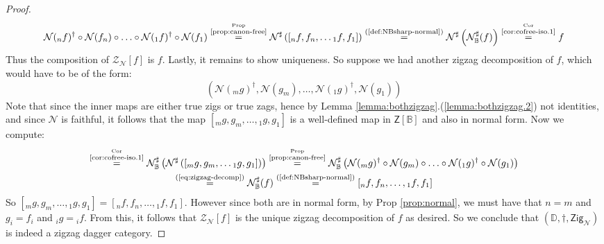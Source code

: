 \documentclass[10pt]{article}
\begin{document}
\begin{proof}
\begin{gather*}
\mathcal{N}({}_nf)^\dagger \circ \mathcal{N}(f_n) \circ \hdots \circ \mathcal{N}({}_1f)^\dagger \circ \mathcal{N}(f_1) \overset{\overset{\text{Prop}}{\text{\ref{prop:canon-free}}}}{=} \mathcal{N}^\sharp\left(\left[ {}_nf, f_n, \hdots {}_1f, f_1 \right]  \right) \overset{\text{(\ref{def:NBsharp-normal})}}{=} \mathcal{N}^\sharp\left(\mathcal{N}_\mathbb{B}^\sharp(f) \right) \overset{\overset{\text{Cor}}{\text{\ref{cor:cofree-iso.1}}}}{=} f
\end{gather*}
Thus the composition of $\mathcal{Z}_{\mathcal{N}}[f]$ is $f$. Lastly, it remains to show uniqueness. So suppose we had another zigzag decomposition of $f$, which would have to be of the form:
\[ \left( \mathcal{N}({}_mg)^\dagger, \mathcal{N}(g_m), \hdots, \mathcal{N}({}_1g)^\dagger, \mathcal{N}(g_1) \right) \]
Note that since the inner maps are either true zigs or true zags, hence by Lemma \ref{lemma:bothzigzag}.(\ref{lemma:bothzigzag.2}) not identities, and since $\mathcal{N}$ is faithful, it follows that the map $[{}_mg, g_m, \hdots, {}_1g, g_1]$ is a well-defined map in $\mathsf{Z}[\mathbb{B}]$ and also in normal form. Now we compute: 
\begin{gather*}
[{}_mg, g_m, \hdots, {}_1g, g_1] \overset{\overset{\text{Cor}}{\text{\ref{cor:cofree-iso.1}}}}{=} \mathcal{N}_\mathbb{B}^\sharp \left( \mathcal{N}^\sharp\left(\left[ {}_mg, g_m, \hdots {}_1g, g_1 \right]  \right) \right) \overset{\overset{\text{Prop}}{\text{\ref{prop:canon-free}}}}{=} \mathcal{N}_\mathbb{B}^\sharp \left( \mathcal{N}({}_mg)^\dagger \circ \mathcal{N}(g_m) \circ \hdots \circ \mathcal{N}({}_1g)^\dagger \circ \mathcal{N}(g_1) \right) \\\overset{\text{(\ref{eq:zigzag-decomp})}}{=} \mathcal{N}_\mathbb{B}^\sharp(f) \overset{\text{(\ref{def:NBsharp-normal})}}{=} \left[ {}_nf, f_n, \hdots, {}_1f, f_1 \right] 
\end{gather*}
So $[{}_mg, g_m, \hdots, {}_1g, g_1] = \left[ {}_nf, f_n, \hdots, {}_1f, f_1 \right]$. However since both are in normal form, by Prop \ref{prop:normal}, we must have that $n=m$ and $g_i=f_i$ and ${}_ig={}_if$. From this, it follows that $\mathcal{Z}_{\mathcal{N}}[f]$ is the unique zigzag decomposition of $f$ as desired. So we conclude that $(\mathbb{D}, \dagger, \mathsf{Zig}_\mathcal{N})$ is indeed a zigzag dagger category. 
\end{proof}
\end{document}
